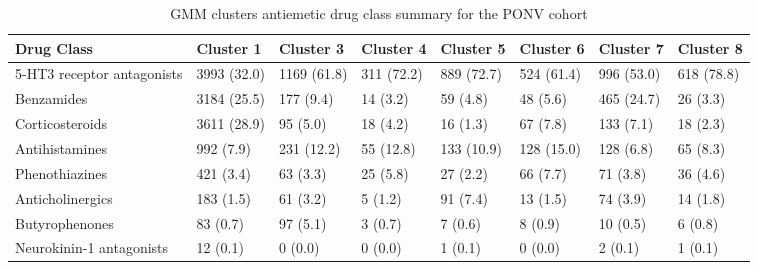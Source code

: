 \begin{table}

\caption{GMM clusters antiemetic drug class summary for the PONV cohort}
\centering
\begin{tabular}[t]{llllllll}
\toprule
Drug Class & Cluster 1 & Cluster 3 & Cluster 4 & Cluster 5 & Cluster 6 & Cluster 7 & Cluster 8\\
\midrule
5-HT3 receptor antagonists & 3993 (32.0) & 1169 (61.8) & 311 (72.2) & 889 (72.7) & 524 (61.4) & 996 (53.0) & 618 (78.8)\\
Benzamides & 3184 (25.5) & 177 (9.4) & 14 (3.2) & 59 (4.8) & 48 (5.6) & 465 (24.7) & 26 (3.3)\\
Corticosteroids & 3611 (28.9) & 95 (5.0) & 18 (4.2) & 16 (1.3) & 67 (7.8) & 133 (7.1) & 18 (2.3)\\
Antihistamines & 992 (7.9) & 231 (12.2) & 55 (12.8) & 133 (10.9) & 128 (15.0) & 128 (6.8) & 65 (8.3)\\
Phenothiazines & 421 (3.4) & 63 (3.3) & 25 (5.8) & 27 (2.2) & 66 (7.7) & 71 (3.8) & 36 (4.6)\\
\addlinespace
Anticholinergics & 183 (1.5) & 61 (3.2) & 5 (1.2) & 91 (7.4) & 13 (1.5) & 74 (3.9) & 14 (1.8)\\
Butyrophenones & 83 (0.7) & 97 (5.1) & 3 (0.7) & 7 (0.6) & 8 (0.9) & 10 (0.5) & 6 (0.8)\\
Neurokinin-1 antagonists & 12 (0.1) & 0 (0.0) & 0 (0.0) & 1 (0.1) & 0 (0.0) & 2 (0.1) & 1 (0.1)\\
\bottomrule
\end{tabular}
\end{table}
